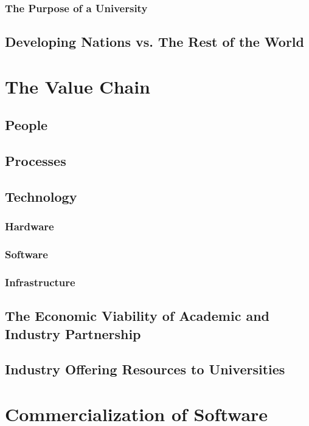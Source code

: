 \subsubsection{The Purpose of a University}
\subsection{Developing Nations vs. The Rest of the World}
\section{The Value Chain}
\subsection{People}
\subsection{Processes}
\subsection{Technology}
\subsubsection{Hardware}
\subsubsection{Software}
\subsubsection{Infrastructure}
\subsection{The Economic Viability of Academic and Industry Partnership}
\subsection{Industry Offering Resources to Universities}
\section{Commercialization of Software}
